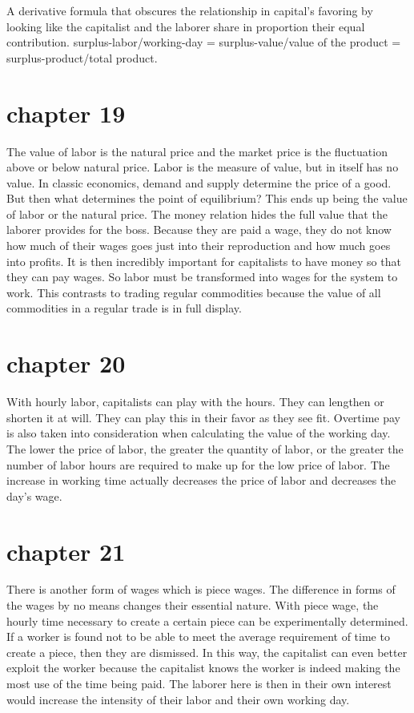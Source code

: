 \documentclass{article}
\begin{document}
A derivative formula that obscures the relationship in capital's favoring  by looking like the capitalist and the laborer share in proportion their equal contribution.
surplus-labor/working-day = surplus-value/value of the product = surplus-product/total product.

\section{chapter 19}
The value of labor is the natural price and the market price is the fluctuation above or below natural price. Labor is the measure of value, but in itself has no value. In classic economics, demand and supply determine the price of a good. But then what determines the point of equilibrium? This ends up being the value of labor or the natural price. The money relation hides the full value that the laborer provides for the boss. Because they are paid a wage, they do not know how much of their wages goes just into their reproduction and how much goes into profits. It is then incredibly important for capitalists to have money so that they can pay wages. So labor must be transformed into wages for the system to work. This contrasts to trading regular commodities because the value of all commodities in a regular trade is in full display. 

\section{chapter 20}
With hourly labor, capitalists can play with the hours. They can lengthen or shorten it at will. They can play this in their favor as they see fit. Overtime pay is also taken into consideration when calculating the value of the working day. The lower the price of labor, the greater the quantity of labor, or the greater the number of labor hours are required to make up for the low price of labor. The increase in working time actually decreases the price of labor and decreases the day's wage. 

\section{chapter 21}
There is another form of wages which is piece wages. The difference in forms of the wages by no means changes their essential nature. With piece wage, the hourly time necessary to create a certain piece can be experimentally determined. If a worker is found not to be able to meet the average requirement of time to create a piece, then they are dismissed. In this way, the capitalist can even better exploit the worker because the capitalist knows the worker is indeed making the most use of the time being paid. The laborer here is then in their own interest would increase the intensity of their labor and their own working day. 
\end{document}
